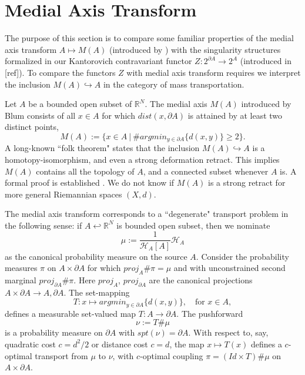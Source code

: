 \documentclass[12pt]{article}
\theoremstyle{definition}
\theoremstyle{remark}
\newcommand{\bR}{\mathbb{R}}
\newcommand{\del}{\partial}
\newcommand{\hh}{\hookleftarrow}
\begin{document}
\pagestyle{fancy}
\fancyhf{}
\lhead{\today}
\rfoot{}

\section{Medial Axis Transform}
The purpose of this section is to compare some familiar properties of the medial axis transform $A\mapsto M(A)$ (introduced by \cite{Blum}) with the singularity structures formalized in our Kantorovich contravariant functor $Z: 2^{\del A} \to 2^A$ (introduced in [ref]). To compare the functors $Z$ with medial axis transform requires we interpret the inclusion $M(A) \hookrightarrow A$ in the category of mass transportation.
 

Let $A$ be a bounded open subset of $\bR^N$. The medial axis $M(A)$ introduced by Blum consists of all $x\in A$ for which $dist(x, \del A)$ is attained by at least two distinct points, \begin{equation}\label{medialaxis}   M(A):=\{x\in A~|~ \# argmin_{y\in \del A} \{ d(x,y)\} \geq 2 \}.\end{equation}
A long-known ``folk theorem" states that the inclusion $M(A) \hookrightarrow A$ is a homotopy-isomorphism, and even a strong deformation retract. This implies $M(A)$ contains all the topology of $A$, and a connected subset whenever $A$ is. A formal proof is established \cite{Lieutier}. We do not know if $M(A)$ is a strong retract for more general Riemannian spaces $(X,d)$.


The medial axis transform corresponds to a ``degenerate" transport problem in the following sense: if $A \hh \bR^N$ is bounded open subset, then we nominate \begin{equation}\label{mu} \mu:=\frac{1}{\mathscr{H}_A[A]} \mathscr{H}_A \end{equation} as the canonical probability measure on the source $A$. Consider the probability measures $\pi$ on $A\times \del A$ for which $proj_A \# \pi=\mu$ and with unconstrained second marginal $proj_{\del A} \# \pi$. Here $proj_A$, $proj_{\del A}$ are the canonical projections $A\times \del A \to A, \del A$. The set-mapping \begin{equation}\label{T} T:x \mapsto argmin_{y\in \del A} \{d(x,y)\}, ~~~\text{~for~} x\in A,\end{equation} defines a measurable set-valued map $T: A\to \del A$. The pushforward \begin{equation}\label{nu} \nu:=T\# \mu\end{equation} is a probability measure on $\del A$ with $spt(\nu)=\del A$. With respect to, say, quadratic cost $c=d^2/2$ or distance cost $c=d$, the map $x\mapsto T(x)$ defines a $c$-optimal transport from $\mu$ to $\nu$, with $c$-optimal coupling $\pi=(Id \times T)\# \mu$ on $A \times \del A$. 
\end{document}
